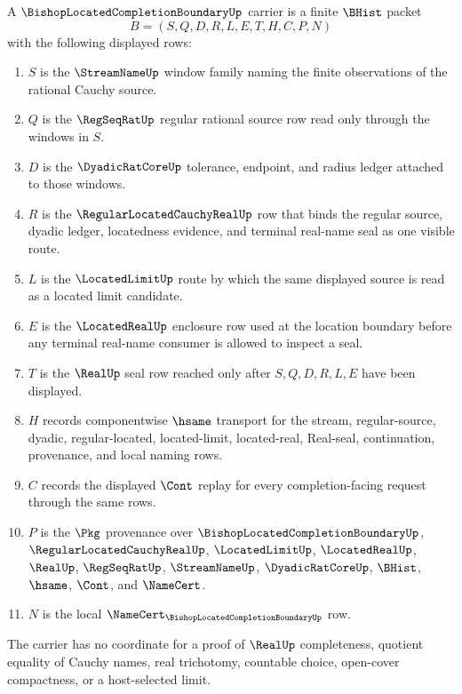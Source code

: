\begin{definition}
\label{def:bishop-located-completion-boundary-carrier}
A $\BishopLocatedCompletionBoundaryUp$ carrier is a finite $\BHist$ packet
$$
B=(S,Q,D,R,L,E,T,H,C,P,N)
$$
with the following displayed rows:
\begin{enumerate}
\item $S$ is the $\StreamNameUp$ window family naming the finite observations of the rational Cauchy source.
\item $Q$ is the $\RegSeqRatUp$ regular rational source row read only through the windows in $S$.
\item $D$ is the $\DyadicRatCoreUp$ tolerance, endpoint, and radius ledger attached to those windows.
\item $R$ is the $\RegularLocatedCauchyRealUp$ row that binds the regular source, dyadic ledger, locatedness evidence, and terminal real-name seal as one visible route.
\item $L$ is the $\LocatedLimitUp$ route by which the same displayed source is read as a located limit candidate.
\item $E$ is the $\LocatedRealUp$ enclosure row used at the location boundary before any terminal real-name consumer is allowed to inspect a seal.
\item $T$ is the $\RealUp$ seal row reached only after $S,Q,D,R,L,E$ have been displayed.
\item $H$ records componentwise $\hsame$ transport for the stream, regular-source, dyadic, regular-located, located-limit, located-real, Real-seal, continuation, provenance, and local naming rows.
\item $C$ records the displayed $\Cont$ replay for every completion-facing request through the same rows.
\item $P$ is the $\Pkg$ provenance over $\BishopLocatedCompletionBoundaryUp$, $\RegularLocatedCauchyRealUp$, $\LocatedLimitUp$, $\LocatedRealUp$, $\RealUp$, $\RegSeqRatUp$, $\StreamNameUp$, $\DyadicRatCoreUp$, $\BHist$, $\hsame$, $\Cont$, and $\NameCert$.
\item $N$ is the local $\NameCert_{\BishopLocatedCompletionBoundaryUp}$ row.
\end{enumerate}
The carrier has no coordinate for a proof of $\RealUp$ completeness, quotient equality of Cauchy names, real trichotomy, countable choice, open-cover compactness, or a host-selected limit.
\end{definition}

